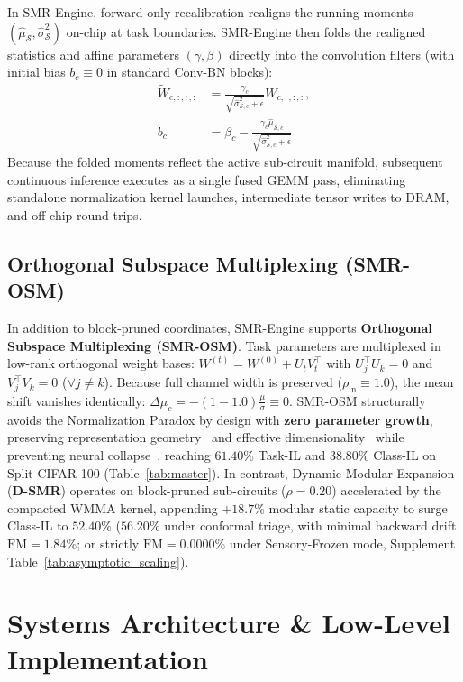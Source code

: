 \documentclass{article}
\begin{document}
In SMR-Engine, forward-only recalibration realigns the running moments $(\hat{\mu}_{\mathcal{S}}, \hat{\sigma}^2_{\mathcal{S}})$ on-chip at task boundaries. SMR-Engine then folds the realigned statistics and affine parameters $(\gamma, \beta)$ directly into the convolution filters (with initial bias $b_c \equiv 0$ in standard Conv-BN blocks):
\begin{align}
    \tilde{W}_{c, :, :, :} &= \frac{\gamma_c}{\sqrt{\hat{\sigma}^2_{\mathcal{S}, c} + \epsilon}} W_{c, :, :, :}, \\
    \tilde{b}_c &= \beta_c - \frac{\gamma_c \hat{\mu}_{\mathcal{S}, c}}{\sqrt{\hat{\sigma}^2_{\mathcal{S}, c} + \epsilon}}
\end{align}
Because the folded moments reflect the active sub-circuit manifold, subsequent continuous inference executes as a single fused GEMM pass, eliminating standalone normalization kernel launches, intermediate tensor writes to DRAM, and off-chip round-trips.

\subsection{Orthogonal Subspace Multiplexing (SMR-OSM)}
In addition to block-pruned coordinates, SMR-Engine supports \textbf{Orthogonal Subspace Multiplexing (SMR-OSM)}. Task parameters are multiplexed in low-rank orthogonal weight bases: $W^{(t)} = W^{(0)} + U_t V_t^\top$ with $U_j^\top U_k = 0$ and $V_j^\top V_k = 0$ ($\forall j \ne k$). Because full channel width is preserved ($\rho_{\mathrm{in}} \equiv 1.0$), the mean shift vanishes identically: $\Delta \mu_c = -(1 - 1.0)\frac{\mu}{\sigma} \equiv 0$. SMR-OSM structurally avoids the Normalization Paradox by design with \textbf{zero parameter growth}, preserving representation geometry~\cite{stringer2019high, kornblith2019similarity} and effective dimensionality~\cite{roy2007effective} while preventing neural collapse~\cite{papyan2020prevalence}, reaching $61.40\%$ Task-IL and $38.80\%$ Class-IL on Split CIFAR-100 (Table~\ref{tab:master}). In contrast, Dynamic Modular Expansion (\textbf{D-SMR}) operates on block-pruned sub-circuits ($\rho=0.20$) accelerated by the compacted WMMA kernel, appending $+18.7\%$ modular static capacity to surge Class-IL to $52.40\%$ ($56.20\%$ under conformal triage, with minimal backward drift $\mathrm{FM}=1.84\%$; or strictly $\mathrm{FM}=0.0000\%$ under Sensory-Frozen mode, Supplement Table~\ref{tab:asymptotic_scaling}).

\section{Systems Architecture \& Low-Level Implementation}
\label{sec:kernels}
\end{document}
